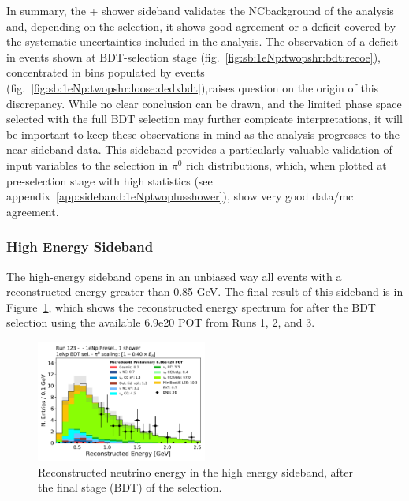 In summary, the + shower sideband validates the NC\pizero background of the analysis and, depending on the selection, it shows good agreement or a deficit covered by the systematic uncertainties included in the analysis. The observation of a deficit in events shown at BDT-selection stage (fig.~\ref{fig:sb:1eNp:twopshr:bdt:recoe}), concentrated in bins populated by \nue events (fig.~\ref{fig:sb:1eNp:twopshr:loose:dedxbdt}),raises question on the origin of this discrepancy. While no clear conclusion can be drawn, and the limited phase space selected with the full BDT selection may further compicate interpretations, it will be important to keep these observations in mind as the analysis progresses to the near-sideband data. This sideband provides a particularly valuable validation of input variables to the \nue selection in $\pi^0$ rich distributions, which, when plotted at pre-selection stage with high statistics (see appendix~\ref{app:sideband:1eNptwoplusshower}), show very good data/mc agreement.

\subsubsection{High Energy Sideband}
\label{sec:sideband:1eNp:he}
The high-energy sideband opens in an unbiased way all events with a reconstructed energy greater than 0.85 GeV. The final result of this sideband is in Figure~\ref{fig:HE_1eNp_reco_e}, which shows the reconstructed energy spectrum for \npsel after the BDT selection using the available 6.9e20 POT from Runs 1, 2, and 3.
\begin{figure}[H]
    \begin{center}
    \includegraphics[width=0.5\textwidth]{Sidebands/Figures/1eNp/HighEnergy/reco_e.pdf}
    \caption{Reconstructed neutrino energy in the high energy sideband, after the final stage (BDT) of the \npsel selection.}
    \label{fig:HE_1eNp_reco_e}
    \end{center}
\end{figure}

